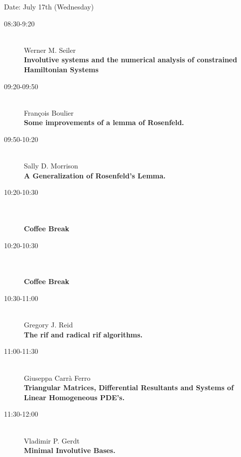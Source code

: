 Date: July 17th (Wednesday)
\begin{description}
\item[08:30-9:20] \ \\
  Werner M. Seiler\\
  {\bf Involutive systems and the numerical analysis of constrained Hamiltonian Systems
} 
\item[09:20-09:50] \ \\
  Fran\c{c}ois Boulier\\
  {\bf Some improvements of a lemma of Rosenfeld.} 
\item[09:50-10:20 ] \ \\
  Sally D. Morrison\\
  {\bf A Generalization of Rosenfeld's Lemma.
} 
\item[10:20-10:30] \ \\
  \\
  {\bf Coffee Break} 
\item[10:20-10:30 ] \ \\
  \\
  {\bf Coffee Break } 
\item[10:30-11:00] \ \\
  Gregory J. Reid\\
  {\bf The rif and radical rif algorithms.
} 
\item[11:00-11:30 ] \ \\
  Giuseppa Carr\`a Ferro\\
  {\bf Triangular Matrices, Differential Resultants and Systems of Linear Homogeneous
    PDE's.} 
\item[11:30-12:00] \ \\
  Vladimir P. Gerdt\\
  {\bf Minimal Involutive Bases.} 
\end{description}


